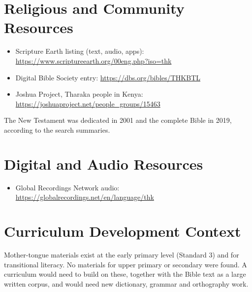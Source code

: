 \documentclass[12pt]{article}
\begin{document}
\section{Religious and Community Resources}
\begin{itemize}
\item Scripture Earth listing (text, audio, apps): \url{https://www.scriptureearth.org/00eng.php?iso=thk}
\item Digital Bible Society entry: \url{https://dbs.org/bibles/THKBTL}
\item Joshua Project, Tharaka people in Kenya: \url{https://joshuaproject.net/people_groups/15463}
\end{itemize}
The New Testament was dedicated in 2001 and the complete Bible in 2019, according to the search summaries.

\section{Digital and Audio Resources}
\begin{itemize}
\item Global Recordings Network audio: \url{https://globalrecordings.net/en/language/thk}
\end{itemize}

\section{Curriculum Development Context}
Mother-tongue materials exist at the early primary level (Standard 3) and for transitional literacy. No materials for upper primary or secondary were found. A curriculum would need to build on these, together with the Bible text as a large written corpus, and would need new dictionary, grammar and orthography work.
\end{document}
